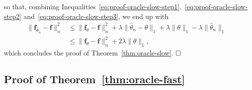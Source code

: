 \documentclass[
	fontsize=11pt, %
	twoside=false, %
	numbers=noenddot, %
]{kaobook}
\renewcommand{\bf}{{\boldsymbol f}}
\newcommand{\wh}{\widehat}
\newcommand{\norm}[1]{\| #1 \|}
\begin{document}
so that, combining Inequalities~\eqref{eq:proof-oracle-slow-step1},~\eqref{eq:proof-oracle-slow-step2} and~\eqref{eq:proof-oracle-slow-step3}, we end up with
\begin{align*}
	\norm{\bf_{\wh \theta_n} - \bf}_n^2 &\leq \norm{\bf_\theta - \bf}_n^2 
	+ \lambda \norm{\wh \theta_n - \theta}_1 
	+ \lambda \norm{\theta}_1 
	- \lambda \norm{\wh \theta_n}_1 \\
	&\leq \norm{\bf_\theta - \bf}_n^2 + 2 \lambda \norm{\theta}_1,
\end{align*}
which concludes the proof of Theorem~\ref{thm:oracle-slow}. $\hfill \square$


\subsection{Proof of Theorem~\ref{thm:oracle-fast}} %
\label{sub:proof_of_theorem_thm:oracle-fast}









% 




\printbibliography[heading=bibintoc, title=Bibliography] %

\end{document}
